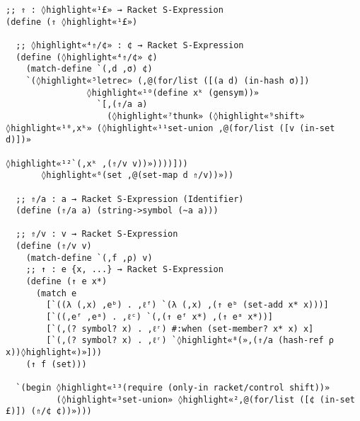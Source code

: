 \documentclass[12pt, oneside]{book}
\begin{document}
\begin{Verbatim}
;; ⇑ : ◊highlight«¹£» → Racket S-Expression
(define (⇑ ◊highlight«¹£»)

  ;; ◊highlight«⁴⇑/¢» : ¢ → Racket S-Expression
  (define (◊highlight«⁴⇑/¢» ¢)
    (match-define `(,d ,σ) ¢)
    `(◊highlight«⁵letrec» (,@(for/list ([(a d) (in-hash σ)])
                ◊highlight«¹⁰(define xᵏ (gensym))»
                  `[,(⇑/a a)
                    (◊highlight«⁷thunk» (◊highlight«⁹shift» ◊highlight«¹⁰,xᵏ» (◊highlight«¹¹set-union ,@(for/list ([v (in-set d)])»
                                                         ◊highlight«¹²`(,xᵏ ,(⇑/v v))»))))]))
       ◊highlight«⁶(set ,@(set-map d ⇑/v))»))

  ;; ⇑/a : a → Racket S-Expression (Identifier)
  (define (⇑/a a) (string->symbol (~a a)))

  ;; ⇑/v : v → Racket S-Expression
  (define (⇑/v v)
    (match-define `(,f ,ρ) v)
    ;; ↑ : e {x, ...} → Racket S-Expression
    (define (↑ e x*)
      (match e
        [`((λ (,x) ,eᵇ) . ,ℓᶠ) `(λ (,x) ,(↑ eᵇ (set-add x* x)))]
        [`((,eᶠ ,eᵃ) . ,ℓᶜ) `(,(↑ eᶠ x*) ,(↑ eᵃ x*))]
        [`(,(? symbol? x) . ,ℓʳ) #:when (set-member? x* x) x]
        [`(,(? symbol? x) . ,ℓʳ) `◊highlight«⁸(»,(⇑/a (hash-ref ρ x))◊highlight«)»]))
    (↑ f (set)))

  `(begin ◊highlight«¹³(require (only-in racket/control shift))»
          (◊highlight«³set-union» ◊highlight«²,@(for/list ([¢ (in-set £)]) (⇑/¢ ¢))»)))
\end{Verbatim}
\end{document}
